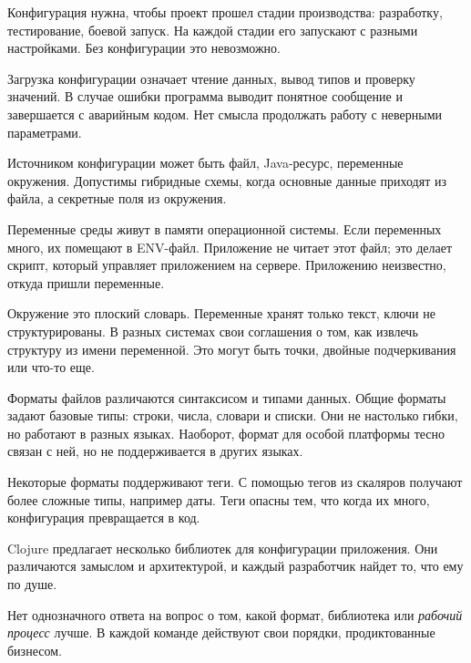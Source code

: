 Конфигурация нужна, чтобы проект прошел стадии производства: разработку,
тестирование, боевой запуск. На каждой стадии его запускают с разными
настройками. Без конфигурации это невозможно.

Загрузка конфигурации означает чтение данных, вывод типов и проверку значений. В
случае ошибки программа выводит понятное сообщение и завершается с аварийным
кодом. Нет смысла продолжать работу с неверными параметрами.

Источником конфигурации может быть файл, Java-ресурс, переменные
окружения. Допустимы гибридные схемы, когда основные данные приходят из файла, а
секретные поля из окружения.

Переменные среды живут в памяти операционной системы. Если переменных много, их
помещают в ENV-файл. Приложение не читает этот файл; это делает скрипт, который
управляет приложением на сервере. Приложению неизвестно, откуда пришли
переменные.

Окружение это плоский словарь. Переменные хранят только текст, ключи не
структурированы. В разных системах свои соглашения о том, как извлечь структуру
из имени переменной. Это могут быть точки, двойные подчеркивания или что-то еще.

Форматы файлов различаются синтаксисом и типами данных. Общие форматы задают
базовые типы: строки, числа, словари и списки. Они не настолько гибки, но
работают в разных языках. Наоборот, формат для особой платформы тесно связан с
ней, но не поддерживается в других языках.

Некоторые форматы поддерживают теги. С помощью тегов из скаляров получают более
сложные типы, например даты. Теги опасны тем, что когда их много, конфигурация
превращается в код.

Clojure предлагает несколько библиотек для конфигурации приложения. Они
различаются замыслом и архитектурой, и каждый разработчик найдет то, что ему по
душе.

Нет однозначного ответа на вопрос о том, какой формат, библиотека или
\emph{рабочий процесс} лучше. В каждой команде действуют свои порядки,
продиктованные бизнесом.

